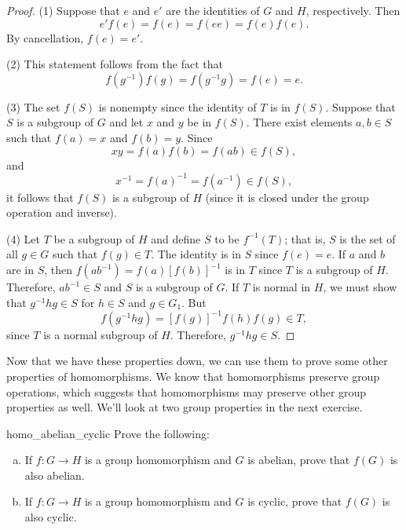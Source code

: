  
\begin{proof}

 
(1)
Suppose that $e$ and $e'$ are the identities of $G$ and $H$,
respectively. Then
\[
e' f(e) = f(e) = f(e e) = f(e) f(e).
\]
By cancellation, $f(e) = e'$.
 
 
(2)
This statement follows from the fact that
\[
f( g^{-1}) f(g) = f(g^{-1} g) = f(e) = e.
\]
 
 
(3)
The set $f(S)$ is nonempty since the identity of $T$ is in
$f(S)$.
Suppose that $S$ is a subgroup of $G$ and let $x$ and $y$ be in
$f(S)$. There exist elements $a, b \in S$ such that $f(a) =
x$ and $f(b)=y$. Since 
\[
xy = f(a) f(b) = f(a b ) \in f(S),
\]
and
\[
x^{-1} = f(a)^{-1} = f(a^{-1}) \in f(S),
\]
it follows that $f(S)$ is a subgroup of $H$ (since it is closed under the group operation and inverse).
  
(4)
Let $T$ be a subgroup of $H$ and define $S$ to be
$f^{-1}(T)$; that is, $S$ is the set of all $g \in G$ such
that $f(g) \in T$.  The identity is in $S$ since $f(e) = e$.
If $a$ and $b$ are in $S$, then $f(ab^{-1}) = f(a)[ f(b)
]^{-1}$ is in $T$ since $T$ is a subgroup of $H$.  Therefore,
$ab^{-1} \in S$ and $S$ is a subgroup of $G$. If $T$ is normal
in $H$, we must show that $g^{-1} h g \in S$ for $h \in S$ and
$g \in G_1$. But 
\[
f( g^{-1} h g) = [ f(g) ]^{-1} f( h ) f( g ) \in
T,
\]
since $T$ is a normal subgroup of $H$.  Therefore, $g^{-1}hg \in
S$.
\end{proof}

Now that we have these properties down, we can use them to prove some other properties of homomorphisms.  
We know that homomorphisms preserve  group operations, which suggests that homomorphisms may preserve other group properties as well. We'll look at two group properties in the next exercise.

 
\begin{exercise}{homo_abelian_cyclic}
Prove the following:
\begin{enumerate}[(a)]
\item
If $f : G \rightarrow H$ is a group homomorphism and $G$ is
abelian, prove that $f(G)$ is also abelian. 
 
\item
If $f : G \rightarrow H$ is a group homomorphism and $G$ is cyclic,
prove that $f(G)$ is also cyclic. 
\end{enumerate}
\end{exercise} 

